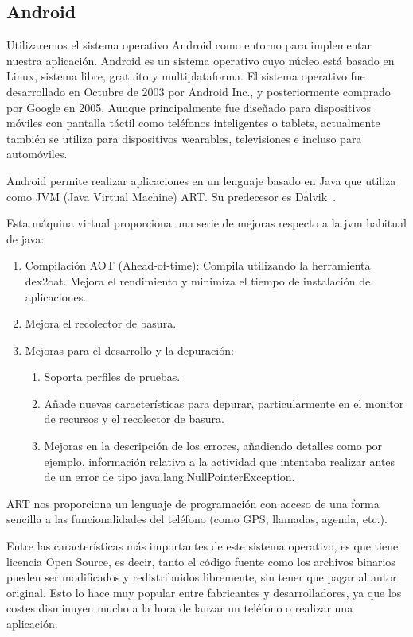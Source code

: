 \subsection{Android}
Utilizaremos el sistema operativo Android como entorno para implementar 
nuestra aplicación.
Android es un sistema operativo cuyo núcleo está basado en Linux,
 sistema libre, gratuito y multiplataforma. El sistema operativo fue 
desarrollado en Octubre de 2003 por Android Inc., y posteriormente
 comprado por Google en 2005.
Aunque principalmente fue diseñado para dispositivos móviles con
 pantalla táctil como teléfonos inteligentes o tablets, actualmente
también se utiliza para dispositivos wearables, televisiones e incluso
 para automóviles.  

Android permite realizar aplicaciones en un lenguaje basado en Java 
que utiliza como JVM (Java Virtual Machine) ART. Su predecesor es Dalvik~\cite{ART}.


Esta máquina virtual proporciona una serie de mejoras respecto a la jvm habitual de java:
\begin{enumerate}
\item	Compilación AOT (Ahead-of-time): Compila utilizando la herramienta dex2oat.
 Mejora el rendimiento y minimiza el tiempo de instalación de aplicaciones.
\item	Mejora el recolector de basura.
\item	Mejoras para el desarrollo y la depuración:
\begin{enumerate}
\item	Soporta perfiles de pruebas.
\item	Añade nuevas características para depurar, particularmente en el monitor
 de recursos y el recolector de basura.
\item	Mejoras en la descripción de los errores, añadiendo detalles 
como por ejemplo, información relativa a la actividad que intentaba
 realizar antes de un error de tipo java.lang.NullPointerException.
\end{enumerate}
\end{enumerate}

ART nos proporciona un lenguaje de programación con acceso 
de una forma sencilla a las funcionalidades del teléfono 
(como GPS, llamadas, agenda, etc.).

Entre las características más importantes de este sistema operativo,
 es que tiene licencia Open Source, es decir, tanto el código fuente 
como los archivos binarios pueden ser modificados y redistribuidos
 libremente, sin tener que pagar al autor original. Esto lo hace muy
 popular entre fabricantes y desarrolladores, ya que los costes 
disminuyen mucho a la hora de lanzar un teléfono o realizar una aplicación.
